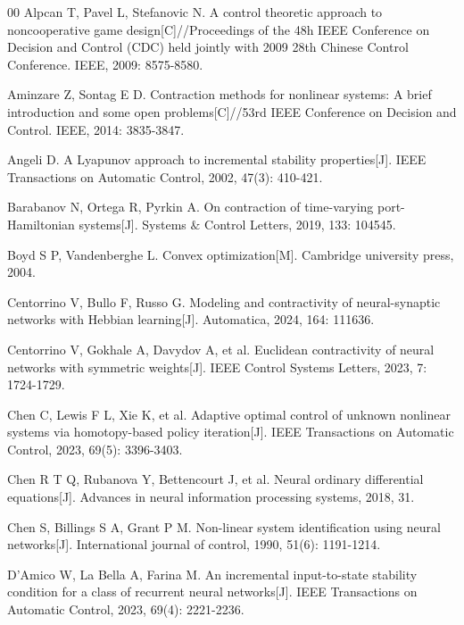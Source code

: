 \documentclass[journal,twoside,web]{ieeecolor}
\begin{document}
\begin{thebibliography}{00}
 Alpcan T, Pavel L, Stefanovic N. A control theoretic approach to noncooperative game design[C]//Proceedings of the 48h IEEE Conference on Decision and Control (CDC) held jointly with 2009 28th Chinese Control Conference. IEEE, 2009: 8575-8580.

 Aminzare Z, Sontag E D. Contraction methods for nonlinear systems: A brief introduction and some open problems[C]//53rd IEEE Conference on Decision and Control. IEEE, 2014: 3835-3847.

 Angeli D. A Lyapunov approach to incremental stability properties[J]. IEEE Transactions on Automatic Control, 2002, 47(3): 410-421.

 Barabanov N, Ortega R, Pyrkin A. On contraction of time-varying port-Hamiltonian systems[J]. Systems $\&$ Control Letters, 2019, 133: 104545.

 Boyd S P, Vandenberghe L. Convex optimization[M]. Cambridge university press, 2004.

 Centorrino V, Bullo F, Russo G. Modeling and contractivity of neural-synaptic networks with Hebbian learning[J]. Automatica, 2024, 164: 111636.

 Centorrino V, Gokhale A, Davydov A, et al. Euclidean contractivity of neural networks with symmetric weights[J]. IEEE Control Systems Letters, 2023, 7: 1724-1729.

 Chen C, Lewis F L, Xie K, et al. Adaptive optimal control of unknown nonlinear systems via homotopy-based policy iteration[J]. IEEE Transactions on Automatic Control, 2023, 69(5): 3396-3403.

 Chen R T Q, Rubanova Y, Bettencourt J, et al. Neural ordinary differential equations[J]. Advances in neural information processing systems, 2018, 31.

 Chen S, Billings S A, Grant P M. Non-linear system identification using neural networks[J]. International journal of control, 1990, 51(6): 1191-1214.

 D'Amico W, La Bella A, Farina M. An incremental input-to-state stability condition for a class of recurrent neural networks[J]. IEEE Transactions on Automatic Control, 2023, 69(4): 2221-2236.


\end{thebibliography}
\end{document}
